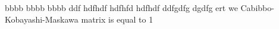 \documentclass{report}
\begin{document}
bbbb bbbb bbbb ddf hdfhdf hdfhfd hdfhdf ddfgdfg dgdfg ert we Cabibbo-Kobayashi-Maskawa matrix is equal to 1
\end{document}
